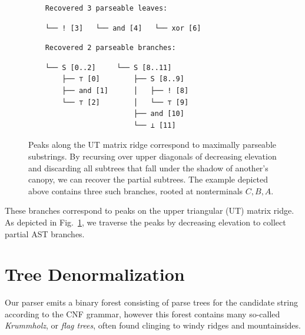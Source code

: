 \documentclass[sigplan,review,anonymous,acmsmall]{acmart}\settopmatter{printfolios=false,printccs=false,printacmref=false}
\begin{document}
\begin{figure}[H]
\begin{minipage}[l]{6cm}
      \begin{verbatim}
    Recovered 3 parseable leaves:
      \end{verbatim}
      \noindent\hspace{0.64cm}\hspace{1.70cm}\hspace{1.98cm}\vspace{-5pt}
      \begin{verbatim}
    └── ! [3]   └── and [4]   └── xor [6]
      \end{verbatim}

      \begin{verbatim}
    Recovered 2 parseable branches:
      \end{verbatim}
    \hspace{0.63cm}\hspace{2.48cm}\vspace{-5pt}
      \begin{verbatim}
    └── S [0..2]     └── S [8..11]
        ├── ⊤ [0]        ├── S [8..9]
        ├── and [1]      │   ├── ! [8]
        └── ⊤ [2]        │   └── ⊤ [9]
                         ├── and [10]
                         └── ⊥ [11]
      \end{verbatim}
    \end{minipage}
  \caption{Peaks along the UT matrix ridge correspond to maximally parseable substrings. By recursing over upper diagonals of decreasing elevation and discarding all subtrees that fall under the shadow of another's canopy, we can recover the partial subtrees. The example depicted above contains three such branches, rooted at nonterminals $C, B, A$.}\label{fig:peaks}
\end{figure}

\noindent These branches correspond to peaks on the upper triangular (UT) matrix ridge. As depicted in Fig.~\ref{fig:peaks}, we traverse the peaks by decreasing elevation to collect partial AST branches.

\section{Tree Denormalization}


Our parser emits a binary forest consisting of parse trees for the candidate string according to the CNF grammar, however this forest contains many so-called \textit{Krummholz}, or \textit{flag trees}, often found clinging to windy ridges and mountainsides.
\end{document}
